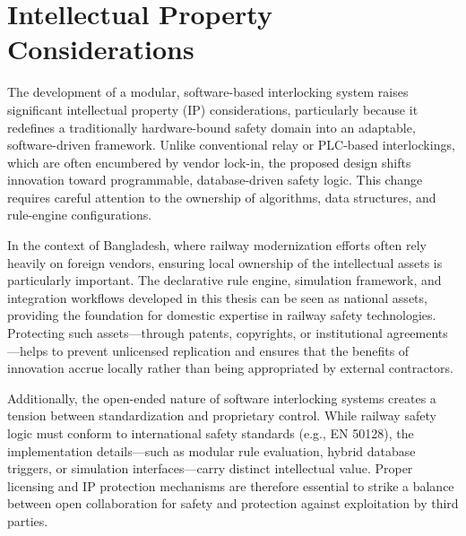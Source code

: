 \section{Intellectual Property Considerations}
\label{sec:outro:property}

The development of a modular, software-based interlocking system raises significant intellectual property (IP) considerations, particularly because it redefines a traditionally hardware-bound safety domain into an adaptable, software-driven framework. Unlike conventional relay or PLC-based interlockings, which are often encumbered by vendor lock-in, the proposed design shifts innovation toward programmable, database-driven safety logic. This change requires careful attention to the ownership of algorithms, data structures, and rule-engine configurations.

In the context of Bangladesh, where railway modernization efforts often rely heavily on foreign vendors, ensuring local ownership of the intellectual assets is particularly important. The declarative rule engine, simulation framework, and integration workflows developed in this thesis can be seen as national assets, providing the foundation for domestic expertise in railway safety technologies. Protecting such assets—through patents, copyrights, or institutional agreements—helps to prevent unlicensed replication and ensures that the benefits of innovation accrue locally rather than being appropriated by external contractors.

Additionally, the open-ended nature of software interlocking systems creates a tension between standardization and proprietary control. While railway safety logic must conform to international safety standards (e.g., EN 50128), the implementation details—such as modular rule evaluation, hybrid database triggers, or simulation interfaces—carry distinct intellectual value. Proper licensing and IP protection mechanisms are therefore essential to strike a balance between open collaboration for safety and protection against exploitation by third parties.